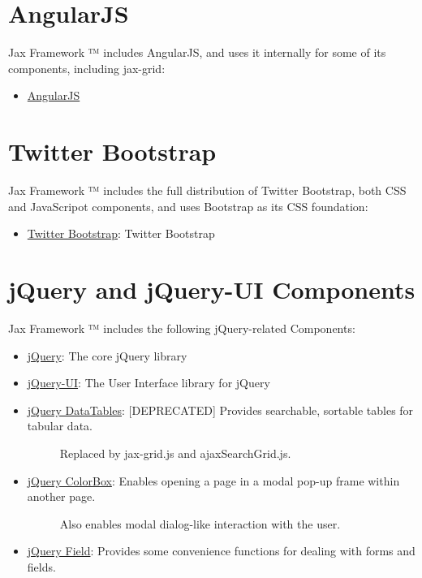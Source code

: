 \documentclass[letterpaper,10pt,english]{sphinxmanual}
\begin{document}
\section{AngularJS}
\label{jaxFrameworkGuide:id2}
Jax Framework ™ includes AngularJS, and uses it internally for some of its components,
including jax-grid:
\begin{itemize}
\item {} 
\href{https://angularjs.org/}{AngularJS}

\end{itemize}


\section{Twitter Bootstrap}
\label{jaxFrameworkGuide:id4}
Jax Framework ™ includes the full distribution of Twitter Bootstrap, both CSS and JavaScripot
components, and uses Bootstrap as its CSS foundation:
\begin{itemize}
\item {} 
\href{http://twitter.github.com/bootstrap/}{Twitter Bootstrap}: Twitter Bootstrap

\end{itemize}


\section{jQuery and jQuery-UI Components}
\label{jaxFrameworkGuide:jquery-and-jquery-ui-components}
Jax Framework ™ includes the following jQuery-related Components:
\begin{itemize}
\item {} 
\href{http://jquery.com/}{jQuery}: The core jQuery library

\item {} 
\href{http://jqueryui.com/}{jQuery-UI}: The User Interface library for jQuery

\item {} \begin{description}
\item[{\href{http://datatables.net/}{jQuery DataTables}: {[}DEPRECATED{]}  Provides searchable, sortable tables for tabular data.}] \leavevmode
Replaced by jax-grid.js and ajaxSearchGrid.js.

\end{description}

\item {} \begin{description}
\item[{\href{http://www.jacklmoore.com/colorbox/}{jQuery ColorBox}: Enables opening a page in a modal pop-up frame within another page.}] \leavevmode
Also enables modal dialog-like interaction with the user.

\end{description}

\item {} 
\href{http://www.pengoworks.com/workshop/jquery/field/field.plugin.htm}{jQuery Field}: Provides some convenience functions for dealing with forms and fields.

\end{itemize}
\end{document}
